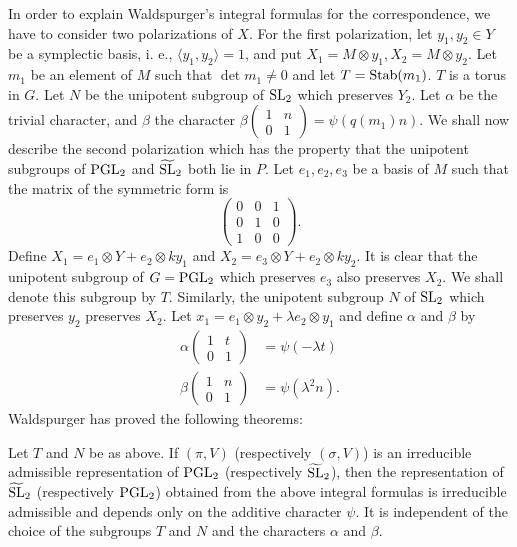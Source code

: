 In order to explain Waldspurger's integral formulas for the correspondence, we have to consider two polarizations of $X$. For the first polarization, let $y_1, y_2 \in Y$ be a symplectic basis, i. e., $\langle y_1, y_2 \rangle = 1$, and put $X_1 = M \otimes y_1, X_2 = M \otimes y_2$.
Let $m_1$ be an element of $M$ such that $\det m_1 \neq 0$ and let $T = \mathrm{Stab}(m_1)$.
$T$ is a torus in $G$.
Let $N$ be the unipotent subgroup of $\mathrm{SL}_2$ which preserves $Y_2$.
Let $\alpha$ be the trivial character, and $\beta$ the character $\beta\left(\begin{smallmatrix} 1 & n \\ 0 & 1\end{smallmatrix}\right) = \psi(q(m_1)n)$.
We shall now describe the second polarization which has the property that the unipotent subgroups of $\mathrm{PGL}_2$ and $\widetilde{\mathrm{SL}}_2$ both lie in $P$.
Let $e_1, e_2, e_3$ be a basis of $M$ such that the matrix of the symmetric form is
\[
\begin{pmatrix}
0 & 0 & 1 \\ 0 & 1 & 0 \\ 1 & 0 & 0
\end{pmatrix}.
\]
Define $X_1 = e_1 \otimes Y + e_2 \otimes ky_1$ and $X_2 = e_3 \otimes Y + e_2 \otimes ky_2$.
It is clear that the unipotent subgroup of $G = \mathrm{PGL}_2$ which preserves $e_3$ also preserves $X_2$.
We shall denote this subgroup by $T$. Similarly, the unipotent subgroup $N$ of $\mathrm{SL}_2$ which preserves $y_2$ preserves $X_2$.
Let $x_1 = e_1 \otimes y_2 + \lambda e_2 \otimes y_1$ and define $\alpha$ and $\beta$ by
\begin{align*}
    \alpha\begin{pmatrix}
        1 & t \\ 0 & 1
    \end{pmatrix} &= \psi(-\lambda t) \\
    \beta\begin{pmatrix}
        1 & n \\ 0 & 1
    \end{pmatrix} &= \psi(\lambda^2 n).
\end{align*}
Waldspurger has proved the following theorems:
\begin{theorem}
\label{thm:2.1}
Let $T$ and $N$ be as above.
If $(\pi, V)$ (respectively $(\sigma, V)$) is an irreducible admissible representation of $\mathrm{PGL}_2$ (respectively $\widetilde{\mathrm{SL}}_2$), then the representation of $\widetilde{\mathrm{SL}}_2$ (respectively $\mathrm{PGL}_2$) obtained from the above integral formulas is irreducible admissible and depends only on the additive character $\psi$.
It is independent of the choice of the subgroups $T$ and $N$ and the characters $\alpha$ and $\beta$.
\end{theorem}
